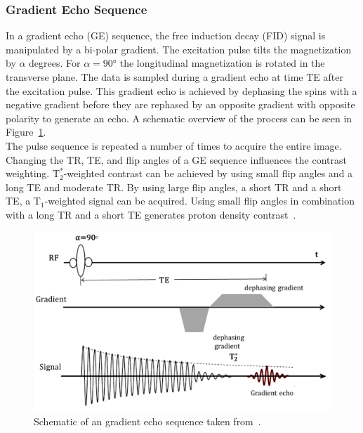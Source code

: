 \documentclass[english,version-2022-01]{uzl-thesis} %
\begin{document}
\subsubsection{Gradient Echo Sequence}
In a gradient echo (GE) sequence, the free induction decay (FID) signal is manipulated by a bi-polar gradient. The excitation pulse tilts the magnetization by $\alpha$ degrees. For $\alpha = 90°$ the longitudinal magnetization is rotated in the transverse plane. The data is sampled during a gradient echo at time TE after the excitation pulse. This gradient echo is achieved by dephasing the spins with a negative gradient before they are rephased by an opposite gradient with opposite polarity to generate an echo. A schematic overview of the process can be seen in Figure~\ref{fig:GradientEcho}. \\
The pulse sequence is repeated a number of times to acquire the entire image. 
Changing the TR, TE, and flip angles of a GE sequence influences the contrast weighting. $\text{T}^*_2$-weighted contrast can be achieved by using small flip angles and a long TE and moderate TR. By using large flip angles, a short TR and a short TE, a $\text{T}_1$-weighted signal can be acquired. Using small flip angles in combination with a long TR and a short TE generates proton density contrast~\cite{PulseSequences}.%

\begin{figure}[htpb]
	\centering
	\graphicspath{{images/}{\main/images/}}
	\includegraphics[width=\linewidth]{GradientEcho.png} 
	\caption{Schematic of an gradient echo sequence taken from~\cite{PulseSequences}.}
	\label{fig:GradientEcho}
\end{figure}
\end{document}
